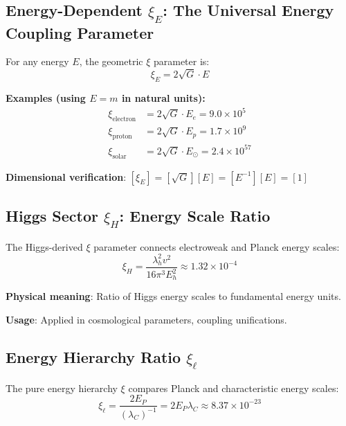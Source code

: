 \documentclass[12pt,a4paper]{article}
\begin{document}
\subsection{Energy-Dependent $\xi_E$: The Universal Energy Coupling Parameter}
\label{subsec:xi_energy_dependent}

For any energy $E$, the geometric $\xi$ parameter is:
\begin{equation}
	\boxed{\xi_E = 2\sqrt{G} \cdot E}
\end{equation}

\textbf{Examples (using $E = m$ in natural units):}
\begin{align}
	\xi_{\text{electron}} &= 2\sqrt{G} \cdot E_e = 9.0 \times 10^5 \\
	\xi_{\text{proton}} &= 2\sqrt{G} \cdot E_p = 1.7 \times 10^9 \\
	\xi_{\text{solar}} &= 2\sqrt{G} \cdot E_\odot = 2.4 \times 10^{57}
\end{align}

\textbf{Dimensional verification}: $[\xi_E] = [\sqrt{G}][E] = [E^{-1}][E] = [1]$ \checkmark

\subsection{Higgs Sector $\xi_H$: Energy Scale Ratio}
\label{subsec:xi_higgs}

The Higgs-derived $\xi$ parameter connects electroweak and Planck energy scales:
\begin{equation}
	\boxed{\xi_H = \frac{\lambda_h^2 v^2}{16\pi^3 E_h^2} \approx 1.32 \times 10^{-4}}
\end{equation}

\textbf{Physical meaning}: Ratio of Higgs energy scales to fundamental energy units.

\textbf{Usage}: Applied in cosmological parameters, coupling unifications.

\subsection{Energy Hierarchy Ratio $\xi_\ell$}
\label{subsec:xi_energy_hierarchy}

The pure energy hierarchy $\xi$ compares Planck and characteristic energy scales:
\begin{equation}
	\boxed{\xi_\ell = \frac{2E_P}{(\lambda_C)^{-1}} = 2E_P \lambda_C \approx 8.37 \times 10^{-23}}
\end{equation}
\end{document}
